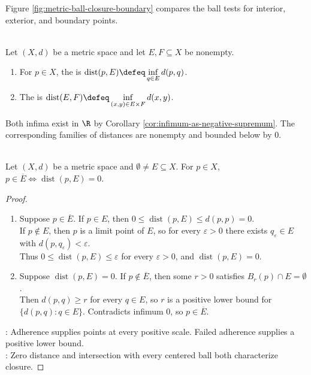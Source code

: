 \begin{illustrationfigure}[H]
  \centering
  
  \caption{Interior, exterior, and boundary points are distinguished by how small balls meet $E$ and $E^c$.}
  \label{fig:metric-ball-closure-boundary}
\end{illustrationfigure}
Figure \ref{fig:metric-ball-closure-boundary} compares the ball tests for interior, exterior, and boundary points.

\begin{definition} \label{def:set-distance-in-metric-space} \\
Let $(X,d)$ be a metric space and let $E,F\subseteq X$ be nonempty.
\begin{enumerate}[label=(\roman*)]
\setlength{\itemsep}{0pt}
\item For $p\in X$, the  is $\operatorname{dist}(p,E)\defeq\inf\limits_{q\in E}d(p,q)$.
\item The  is $\operatorname{dist}(E,F)\defeq\inf\limits_{(x,y)\in E\times F}d(x,y)$.
\end{enumerate}
Both infima exist in $\R$ by Corollary \ref{cor:infimum-as-negative-supremum}. The corresponding families of distances are nonempty and bounded below by $0$.
\end{definition}

\begin{proposition} \label{prop:set-distance-closure-criterion} \\
Let $(X,d)$ be a metric space and $\emptyset\ne E\subseteq X$. For $p\in X$, $p\in\overline{E}\Longleftrightarrow \operatorname{dist}(p,E)=0$.
\begin{proof}
\begin{enumerate}[label=\roman*.]
\setlength{\itemsep}{0pt}
\item[$(\Rightarrow)$] Suppose $p\in\overline{E}$. If $p\in E$, then $0\leq\operatorname{dist}(p,E)\leq d(p,p)=0$.\\
If $p\notin E$, then $p$ is a limit point of $E$, so for every $\varepsilon>0$ there exists $q_\varepsilon\in E$ with $d(p,q_\varepsilon)<\varepsilon$.\\
Thus $0\leq\operatorname{dist}(p,E)\leq\varepsilon$ for every $\varepsilon>0$, and $\operatorname{dist}(p,E)=0$.
\item[$(\Leftarrow)$] Suppose $\operatorname{dist}(p,E)=0$. If $p\notin\overline{E}$, then some $r>0$ satisfies $B_r(p)\cap E=\emptyset$.\\
Then $d(p,q)\geq r$ for every $q\in E$, so $r$ is a positive lower bound for $\{d(p,q):q\in E\}$. Contradicts infimum $0$, so $p\in\overline{E}$.
\end{enumerate}
: Adherence supplies points at every positive scale. Failed adherence supplies a positive lower bound.\\
: Zero distance and intersection with every centered ball both characterize closure.
\end{proof}
\end{proposition}

